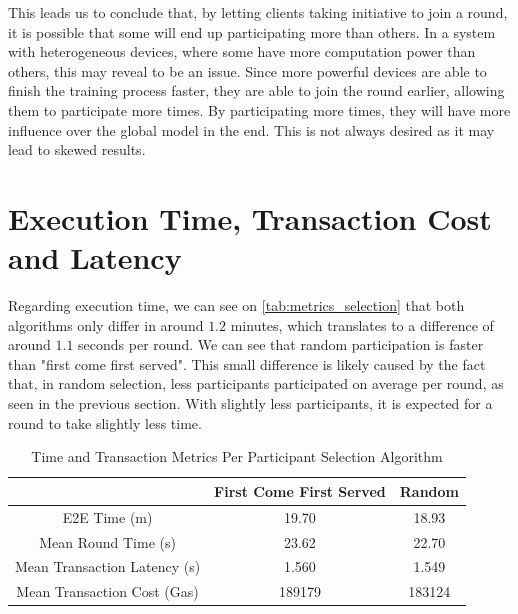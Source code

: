 This leads us to conclude that, by letting clients taking initiative to join a round, it is possible that some will end up participating more than others. In a system with heterogeneous devices, where some have more computation power than others, this may reveal to be an issue. Since more powerful devices are able to finish the training process faster, they are able to join the round earlier, allowing them to participate more times. By participating more times, they will have more influence over the global model in the end. This is not always desired as it may lead to skewed results.

\section{Execution Time, Transaction Cost and Latency}

Regarding execution time, we can see on \autoref{tab:metrics_selection} that both algorithms only differ in around $1.2$ minutes, which translates to a difference of around $1.1$ seconds per round. We can see that random participation is faster than "first come first served". This small difference is likely caused by the fact that, in random selection, less participants participated on average per round, as seen in the previous section. With slightly less participants, it is expected for a round to take slightly less time.

\begin{table}[!ht]
\begin{tabular}{c|c|c} \hline \hline
                              & First Come First Served & Random \\ \hline \hline
E2E Time (m)                   & 19.70                   & 18.93  \\ \hline
Mean Round Time (s)            & 23.62                   & 22.70  \\ \hline
Mean Transaction Latency (s)   & 1.560                   & 1.549  \\ \hline
Mean Transaction Cost (Gas)    & 189179                  & 183124 \\ \hline
\end{tabular}
\caption{Time and Transaction Metrics Per Participant Selection Algorithm}
\label{tab:metrics_selection}
\end{table}

